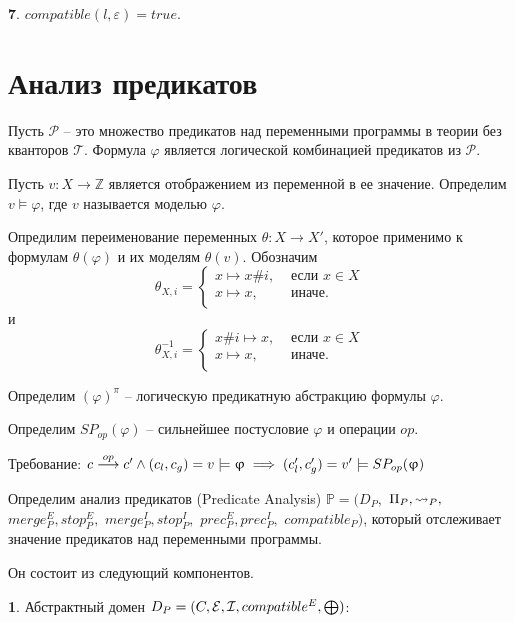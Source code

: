 {\textbf 7.} $compatible(l,\varepsilon) = true$.


\section{Анализ предикатов}
\label{sect_predicate_analysis}
Пусть $\mathscr{P}$ -- это множество предикатов над переменными программы в теории без кванторов $\mathscr{T}$.
Формула $\varphi$ является логической комбинацией предикатов из $\mathscr{P}$.

Пусть $v: X \to \mathbb{Z}$ является отображением из переменной в ее значение.
Определим $v \models \varphi$, где $v$ называется моделью $\varphi$.

Опредилим переименование переменных $\theta: X \to X'$, которое применимо к формулам $\theta(\varphi)$ и их моделям $\theta(v)$.
Обозначим
$$\theta_{X,i}= 
\left\lbrace\begin{array}{ll}
x \mapsto x\#i, & \mbox{ если } x \in X\\
x \mapsto x, &\mbox{ иначе}.\\
\end{array}
\right.
$$
и
$$\theta_{X,i}^{-1}= 
\left\lbrace\begin{array}{ll}
x\#i \mapsto x, & \mbox{ если } x \in X\\
x \mapsto x, &\mbox{ иначе}.\\
\end{array}
\right.
$$

Определим $(\varphi)^\pi$ -- логическую предикатную абстракцию формулы $\varphi$.

Определим $SP_{op}(\varphi)$ -- сильнейшее постусловие $\varphi$ и операции $op$.

Требование: $c \stackrel{op}{\longrightarrow} c' \land (c_l, c_g) = v \models \upvarphi \implies (c_l', c_g') = v' \models SP_{op}(\upvarphi)$

Определим анализ предикатов (Predicate Analysis) $\mathbb{P}=(D_{P},$ $\Pi_{P}, \leadsto_{P},$ $merge^E_{P}, stop^E_{P},$ $merge^I_{P}, stop^I_{P},$ $prec^E_{P},prec^I_{P},$ $compatible_{P})$, который отслеживает значение предикатов над переменными программы.

Он состоит из следующий компонентов.

{\textbf 1.} Абстрактный домен $D_{P}=(C, \mathcal{E}, \mathcal{I}, compatible^E, \mathrel{\bigoplus})$:

